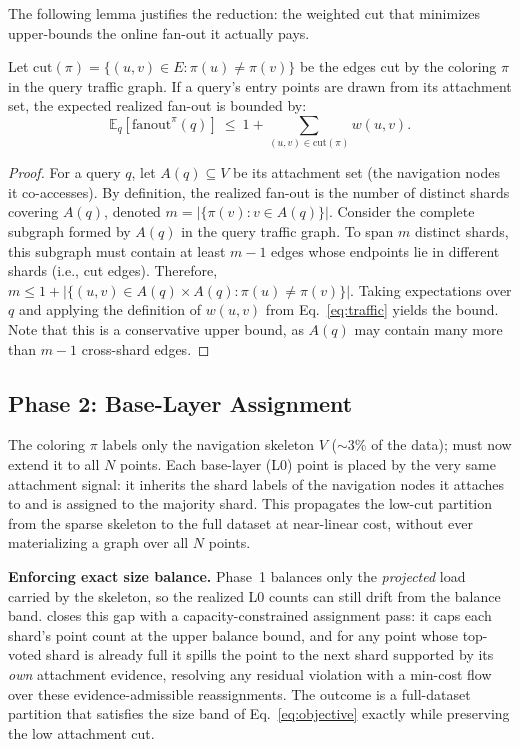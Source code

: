 The following lemma justifies the reduction: the weighted cut that \sysname minimizes upper-bounds the online fan-out it actually pays.

\begin{lemma}
\label{lem:fanout}
Let $\mathrm{cut}(\pi)=\{(u,v)\in E:\pi(u)\neq\pi(v)\}$ be the edges cut by the coloring $\pi$ in the query traffic graph. If a query's entry points are drawn from its attachment set, the expected realized fan-out is bounded by:
\[
\mathbb{E}_{q}\!\left[\mathrm{fanout}^\pi(q)\right]
\ \le\ 1+\!\!\sum_{(u,v)\in\mathrm{cut}(\pi)}\!\! w(u,v).
\]
\end{lemma}

\begin{proof}
For a query $q$, let $A(q) \subseteq V$ be its attachment set (the navigation nodes it co-accesses). By definition, the realized fan-out is the number of distinct shards covering $A(q)$, denoted $m = |\{\pi(v) : v \in A(q)\}|$. Consider the complete subgraph formed by $A(q)$ in the query traffic graph. To span $m$ distinct shards, this subgraph must contain at least $m-1$ edges whose endpoints lie in different shards (i.e., cut edges). Therefore, $m \le 1 + |\{(u,v) \in A(q) \times A(q) : \pi(u) \neq \pi(v)\}|$. Taking expectations over $q$ and applying the definition of $w(u,v)$ from Eq.~\eqref{eq:traffic} yields the bound. Note that this is a conservative upper bound, as $A(q)$ may contain many more than $m-1$ cross-shard edges.
\end{proof}

\subsection{Phase 2: Base-Layer Assignment}
\label{sec:base_assignment}
The coloring $\pi$ labels only the navigation skeleton $V$ ($\sim\!3\%$ of the data); \sysname must now extend it to all $N$ points. Each base-layer (L0) point is placed by the very same attachment signal: it inherits the shard labels of the navigation nodes it attaches to and is assigned to the majority shard. This propagates the low-cut partition from the sparse skeleton to the full dataset at near-linear cost, without ever materializing a graph over all $N$ points.

\noindent\textbf{Enforcing exact size balance.} Phase~1 balances only the \emph{projected} load carried by the skeleton, so the realized L0 counts can still drift from the balance band. \sysname closes this gap with a capacity-constrained assignment pass: it caps each shard's point count at the upper balance bound, and for any point whose top-voted shard is already full it spills the point to the next shard supported by its \emph{own} attachment evidence, resolving any residual violation with a min-cost flow over these evidence-admissible reassignments. The outcome is a full-dataset partition that satisfies the size band of Eq.~\eqref{eq:objective} exactly while preserving the low attachment cut.

